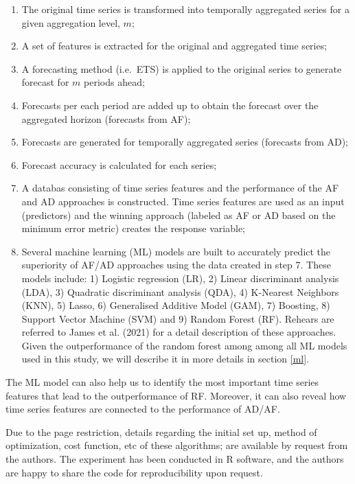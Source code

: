 \documentclass[]{elsarticle} %
\begin{document}
\begin{enumerate}
\def\labelenumi{\arabic{enumi}.}
\item
  The original time series is transformed into temporally aggregated
  series for a given aggregation level, \(m\);
\item
  A set of features is extracted for the original and aggregated time
  series;
\item
  A forecasting method (i.e.~ETS) is applied to the original series to
  generate forecast for \(m\) periods ahead;
\item
  Forecasts per each period are added up to obtain the forecast over the
  aggregated horizon (forecasts from AF);
\item
  Forecasts are generated for temporally aggregated series (forecasts
  from AD);
\item
  Forecast accuracy is calculated for each series;
\item
  A databas consisting of time series features and the performance of
  the AF and AD approaches is constructed. Time series features are used
  as an input (predictors) and the winning approach (labeled as AF or AD
  based on the minimum error metric) creates the response variable;
\item
  Several machine learning (ML) models are built to accurately predict
  the superiority of AF/AD approaches using the data created in step 7.
  These models include: 1) Logistic regression (LR), 2) Linear
  discriminant analysis (LDA), 3) Quadratic discriminant analysis (QDA),
  4) K-Nearest Neighbors (KNN), 5) Lasso, 6) Generalised Additive Model
  (GAM), 7) Boosting, 8) Support Vector Machine (SVM) and 9) Random
  Forest (RF). Rehears are referred to James et al. (2021) for a detail
  description of these approaches. Given the outperformance of the
  random forest among among all ML models used in this study, we will
  describe it in more details in section \ref{ml}.
\end{enumerate}

The ML model can also help us to identify the most important time series
features that lead to the outperformance of RF. Moreover, it can also
reveal how time series features are connected to the performance of
AD/AF.

Due to the page restriction, details regarding the initial set up,
method of optimization, cost function, etc of these algorithms; are
available by request from the authors. The experiment has been conducted
in R software, and the authors are happy to share the code for
reproducibility upon request.
\end{document}
